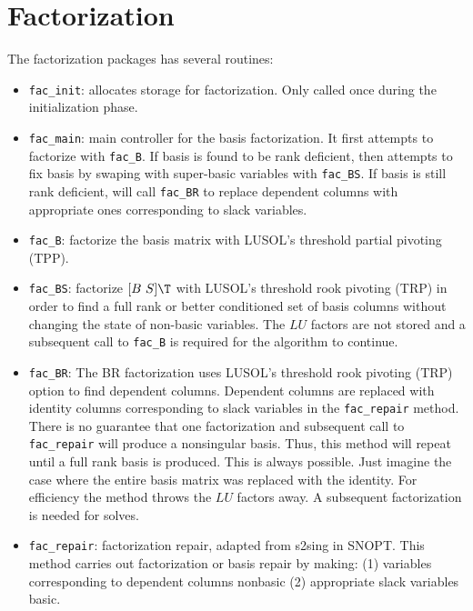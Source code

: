 \documentclass[11pt]{article}
\newcommand{\code}[1]{\texttt{#1}}
\begin{document}
\section{Factorization}

The factorization packages has several routines:
\begin{itemize}
\item \code{fac\_init}: allocates storage for factorization.  Only called once
  during the initialization phase.
\item \code{fac\_main}: main controller for the basis factorization.
  It first attempts to factorize with \code{fac\_B}.  If basis is found to be
  rank deficient, then attempts to fix basis by swaping with super-basic
  variables with \code{fac\_BS}.  If basis is still rank deficient, will call
  \code{fac\_BR} to replace dependent columns with appropriate ones
  corresponding to slack variables.
\item \code{fac\_B}: factorize the basis matrix with LUSOL's threshold partial
  pivoting (TPP).
\item \code{fac\_BS}: factorize $[B\ S]\T$ with LUSOL's threshold rook pivoting
  (TRP) in order to find a full rank or better conditioned set of basis columns
  without changing the state of non-basic variables.  The $LU$ factors are not
  stored and a subsequent call to \code{fac\_B} is required for the algorithm to
  continue.
\item \code{fac\_BR}: The BR factorization uses LUSOL's threshold rook pivoting
  (TRP) option to find dependent columns.  Dependent columns are replaced with
  identity columns corresponding to slack variables in the \code{fac\_repair}
  method.  There is no guarantee that one factorization and subsequent call to
  \code{fac\_repair} will produce a nonsingular basis.  Thus, this method will
  repeat until a full rank basis is produced.  This is always possible.  Just
  imagine the case where the entire basis matrix was replaced with the
  identity.  For efficiency the method throws the $LU$ factors away.  A
  subsequent factorization is needed for solves.
\item \code{fac\_repair}: factorization repair, adapted from s2sing in SNOPT.
  This method carries out factorization or basis repair by making: (1)
  variables corresponding to dependent columns nonbasic (2) appropriate slack
  variables basic.
\end{itemize}
\end{document}
